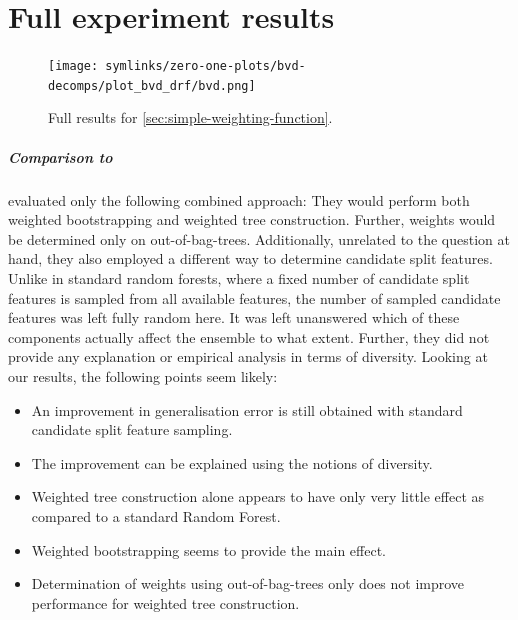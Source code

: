\documentclass[
	twoside=false, %
]{kaobook}
\begin{document}
\chapter{Full experiment results}
\label{sec:drf-full-results}


\begin{figure}
    \texttt{[image: symlinks/zero-one-plots/bvd-decomps/plot\_bvd\_drf/bvd.png]}
    \caption{
      Full results for \cref{sec:simple-weighting-function}. \bvdlegend
    }
    \label{fig:plot_bvd_drf}
\end{figure}

\paragraph{Comparison to \cite{bernard_DynamicRandomForests_2012}} 
\label{sec:comparison-to-bernard-drf}
\citeauthor{bernard_DynamicRandomForests_2012} evaluated only the following combined approach: They would perform both weighted bootstrapping and weighted tree construction. Further, weights would be determined only on out-of-bag-trees. Additionally, unrelated to the question at hand, they also employed a different way to determine candidate split features. Unlike in standard random forests, where a fixed number of candidate split features is sampled from all available features, the number of sampled candidate features was left fully random here. It was left unanswered which of these components actually affect the ensemble to what extent. Further, they did not provide any explanation or empirical analysis in terms of diversity.
Looking at our results, the following points seem likely:
\begin{itemize}
    \item An improvement in generalisation error is still obtained with standard candidate split feature sampling.
    \item The improvement can be explained using the notions of diversity.
    \item Weighted tree construction alone appears to have only very little effect as compared to a standard Random Forest.
    \item Weighted bootstrapping seems to provide the main effect.
    \item Determination of weights using out-of-bag-trees only does not improve performance for weighted tree construction. 
\end{itemize}
\end{document}
